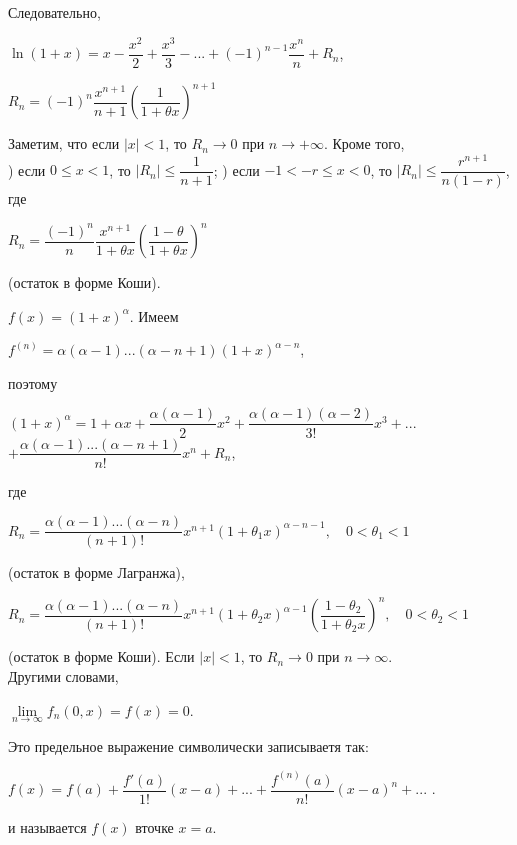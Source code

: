 Следовательно,
\begin{center}
$\ln(1+x)=x-\dfrac{x^2}{2}+\dfrac{x^3}{3}-...+(-1)^{n-1}\dfrac{x^n}{n}+R_n$,
\end{center}
\begin{center}
$R_n=(-1)^n\dfrac{x^{n+1}}{n+1}\left(\dfrac{1}{1+\theta x}\right)^{n+1}$ 
\end{center}
Заметим, что если $|x|<1$, то $R_n\to{0}$ при $n\to{+\infty}$. Кроме того,\\
) если $0\leq x<1$, то $|R_n|\leq\dfrac{1}{n+1}$;
) если $-1<-r\leq x<0$, то $|R_n|\leq\dfrac{r^{n+1}}{n(1-r)}$, где
\begin{center}
$R_n=\dfrac{(-1)^n}{n}\dfrac{x^{n+1}}{1+\theta x}\left(\dfrac{1-\theta}{1+\theta x}\right)^n$
\end{center}
(остаток в форме Коши).

 $f(x)=(1+x)^\alpha$. Имеем
\begin{center}
$f^{(n)}=\alpha (\alpha -1)...(\alpha -n+1)(1+x)^{\alpha -n}$,
\end{center}
поэтому
\begin{center}
$(1+x)^\alpha =1+\alpha x+\dfrac{\alpha(\alpha -1)}{2} x^2+\dfrac{\alpha(\alpha -1)(\alpha -2)}{3!}x^3+...$\\
$+\dfrac{\alpha(\alpha -1)...(\alpha -n+1)}{n!}x^n+R_n$,
\end{center}
где 
\begin{center}
$R_n=\dfrac{\alpha(\alpha -1)...(\alpha -n)}{(n+1)!}x^{n+1}(1+\theta_1x)^{\alpha-n-1}, \quad  0<\theta_1<1$
\end{center}
(остаток в форме Лагранжа),
\begin{center}
$R_n=\dfrac{\alpha(\alpha -1)...(\alpha -n)}{(n+1)!}x^{n+1}(1+\theta_2x)^{\alpha-1}(\dfrac{1-\theta_2}{1+\theta_2x})^n, \quad 0<\theta_2<1$
\end{center}
(остаток в форме Коши). Если $|x|<1$, то $R_n \to 0$ при $n \to \infty.$
\\ 
\vskip 2mm
Другими словами,
\begin{center}
$\lim\limits_{n\to\infty} f_n(0,x)=f(x) = 0$.
\end{center}
Это предельное выражение символически записываетя так:
\begin{center}
$f(x)=f(a)+\dfrac{f'(a)}{1!}(x-a)+...+\dfrac{f^{(n)}(a)}{n!}(x-a)^n+...$ .
\end{center}
\vskip 2mm
и называется  $f(x)$  вточке $x=a$.

